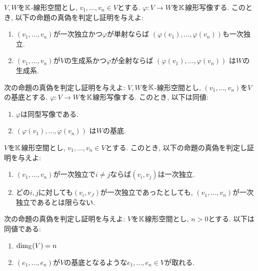 \begin{quiz}
  $V,W$を$\mathbb{K}$-線形空間とし,
  $v_1,\ldots,v_n\in V$とする.
  $\varphi\colon V\to W$を$\mathbb{K}$線形写像する.
  このとき,
  以下の命題の真偽を判定し証明を与えよ:
  \begin{enumerate}
  \item    
    $(v_1,\ldots,v_n)$が一次独立かつ$\varphi$が単射ならば
    $(\varphi(v_1),\ldots,\varphi(v_n))$も一次独立.
  \item
    $(v_1,\ldots,v_n)$が$V$の生成系かつ$\varphi$が全射ならば
    $(\varphi(v_1),\ldots,\varphi(v_n))$
    は$W$の生成系.
  \end{enumerate}
\end{quiz}

\begin{quiz}
  次の命題の真偽を判定し証明を与えよ:
  $V,W$を$\mathbb{K}$-線形空間とし,
  $(v_1,\ldots,v_n)$を$V$の基底とする.
  $\varphi\colon V\to W$を$\mathbb{K}$線形写像する.
  このとき, 以下は同値:
  \begin{enumerate}
  \item
    $\varphi$は同型写像である.
  \item
    $(\varphi(v_1),\ldots,\varphi(v_n))$
    は$W$の基底.
  \end{enumerate}
\end{quiz}


\begin{quiz}
$V$を$\mathbb{K}$線形空間とし, $v_1,\ldots,v_n\in V$とする.
  このとき,
  以下の命題の真偽を判定し証明を与えよ:
  \begin{enumerate}
  \item
    $(v_1,\ldots,v_n)$が一次独立で$i\neq j$ならば$(v_i,v_j)$は一次独立.
  \item
    どの$i,j$に対しても$(v_i,v_J)$が一次独立であったとしても,
    $(v_1,\ldots,v_n)$が一次独立であるとは限らない.
  \end{enumerate}
\end{quiz}


\begin{quiz}
  次の命題の真偽を判定し証明を与えよ:
  $V$を$\mathbb{K}$線形空間とし, $n>0$とする.
  以下は同値である:
  \begin{enumerate}
  \item $\dim_{\mathbb{K}}(V)=n$
  \item $(e_1,\ldots,e_n)$が$V$の基底となるような$e_1,\ldots,e_n\in V$が取れる.
  \end{enumerate}
\end{quiz}

